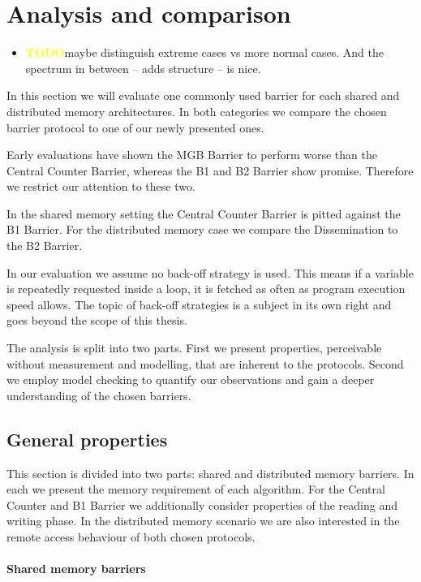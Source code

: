 \documentclass[a4paper, 10pt]{article}
\def \todo{\textbf{\textcolor{yellow}{TODO}}}
\begin{document}
\section{Analysis and comparison}
\label{sec:analysis}
\begin{itemize}
	\item \todo maybe distinguish extreme cases vs more normal cases. And the spectrum in between -- adds structure -- is nice.
\end{itemize}
In this section we will evaluate one commonly used barrier for each shared and distributed memory architectures. In both categories we compare the chosen barrier protocol to one of our newly presented ones.

Early evaluations have shown the MGB Barrier to perform worse than the Central Counter Barrier, whereas the B1 and B2 Barrier show promise. Therefore we restrict our attention to these two.

In the shared memory setting the Central Counter Barrier is pitted against the B1 Barrier. For the distributed memory case we compare the Dissemination to the B2 Barrier.

In our evaluation we assume no back-off strategy is used. This means if a variable is repeatedly requested inside a loop, it is fetched as often as program execution speed allows. The topic of back-off strategies is a subject in its own right and goes beyond the scope of this thesis.

The analysis is split into two parts. First we present properties, perceivable without measurement and modelling, that are inherent to the protocols. Second we employ model checking to quantify our observations and gain a deeper understanding of the chosen barriers.

\subsection{General properties}
\label{sssec:analysis-general}
This section is divided into two parts: shared and distributed memory barriers.
In each we present the memory requirement of each algorithm.
For the Central Counter and B1 Barrier we additionally consider properties of the reading and writing phase.
In the distributed memory scenario we are also interested in the remote access behaviour of both chosen protocols.

\paragraph{Shared memory barriers}
\label{sssec:analysis-general-shared}
\end{document}
